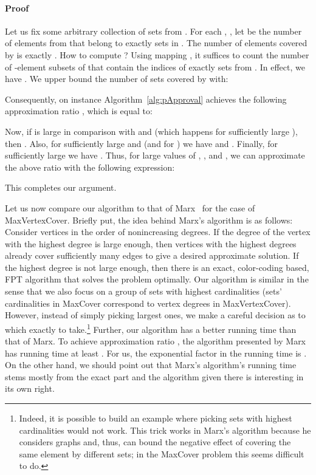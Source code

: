 \documentclass[11pt]{article}
\newenvironment{proof}{\paragraph{Proof}}{\hfill\medskip}
\begin{document}
\begin{proof}
  Let us fix some arbitrary collection  of  sets from
  . For each , , let  be the number
  of elements from  that belong to exactly  sets in .
  The number of elements covered by  is exactly .  How to compute ?
  Using mapping , it suffices to count the number of -element
  subsets of  that contain the indices of exactly  sets from
  . In effect, we have . We upper bound the number of sets covered by  with:
  



  Consequently, on instance  Algorithm~\ref{alg:pApproval} achieves
  the following approximation ratio ,
  which is equal to:
  
  Now, if  is large in comparison with  and  (which happens
  for sufficiently large ), then . Also, for sufficiently large  and 
  (and for ) we have  and . Finally,
  for sufficiently large  we have . Thus, for large values of , , and , we
  can approximate the above ratio with the following expression:
  
This completes our argument.~
\end{proof}


Let us now compare our algorithm to that of
Marx~\cite{Marx06parameterizedcomplexity} for the case of MaxVertexCover.
Briefly put, the idea behind Marx's algorithm is as follows: Consider
vertices in the order of nonincreasing degrees. If the degree of the
vertex with the highest degree is large enough, then  vertices with
the highest degrees already cover sufficiently many edges to give a
desired approximate solution. If the 
highest degree is not large enough, then there is an exact,
color-coding based, FPT algorithm that solves the problem
optimally. Our algorithm is similar in the sense that we also focus on
a group of sets with highest cardinalities (sets' cardinalities in
MaxCover correspond to vertex degrees in MaxVertexCover). However,
instead of simply picking  largest ones, we make a careful decision
as to which exactly to take.\footnote{Indeed, it is possible to build
  an example where picking sets with highest cardinalities would not
  work. This trick works in Marx's algorithm because he considers
  graphs and, thus, can bound the negative effect of covering the same
  element by different sets; in the MaxCover problem this seems
  difficult to do.}
Further, our algorithm has a better running time than that of Marx.
To achieve approximation ratio , the algorithm presented by
Marx has running time at least
. For us, the
exponential factor in the running time is . On the other hand, we should point out that Marx's
algorithm's running time stems mostly from the exact part and the
algorithm given there is interesting in its own right.
\end{document}
